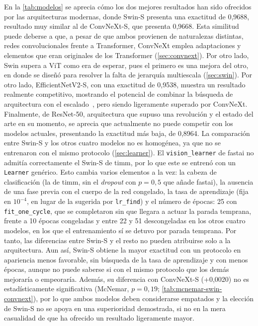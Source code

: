 En la \cref{tab:modelos} se aprecia cómo los dos mejores resultados han sido ofrecidos por las arquitecturas modernas, donde Swin-S presenta una exactitud de 0,9688, resultado muy similar al de ConvNeXt-S, que presenta 0,9668. Esta similitud puede deberse a que, a pesar de que ambos provienen de naturalezas distintas, redes convolucionales frente a Transformer, ConvNeXt emplea adaptaciones y elementos que eran originales de los Transformer (\cref{sec:convnext}). Por otro lado, Swin supera a ViT como era de esperar, pues el primero es una mejora del otro, en donde se diseñó para resolver la falta de jerarquía multiescala (\cref{sec:swin}). Por otro lado, EfficientNetV2-S, con una exactitud de 0,9538, muestra un resultado realmente competitivo, mostrando el potencial de combinar la búsqueda de arquitectura con el escalado~\cite{tan2021}, pero siendo ligeramente superado por ConvNeXt. Finalmente, de ResNet-50, arquitectura que supuso una revolución y el estado del arte en su momento, se aprecia que actualmente no puede competir con los modelos actuales, presentando la exactitud más baja, de 0,8964.
La comparación entre Swin-S y los otros cuatro modelos no es homogénea, ya que no se entrenaron con el mismo protocolo (\cref{sec:learner}). El \texttt{vision\_learner} de fastai no admitía correctamente el Swin-S de timm, por lo que este se entrenó con un \texttt{Learner} genérico. Esto cambia varios elementos a la vez: la cabeza de clasificación (la de timm, sin el \emph{dropout} con $p = 0{,}5$ que añade fastai),
 la ausencia de una fase previa con el cuerpo de la red congelado, la tasa de aprendizaje (fija en $10^{-4}$, en lugar de la sugerida por \texttt{lr\_find}) y el número de épocas: 25 con \texttt{fit\_one\_cycle}, que se completaron sin que llegara a actuar la parada temprana, frente a 10 épocas congeladas y entre 22 y 51 descongeladas en los otros cuatro modelos, en los que el entrenamiento sí se detuvo por parada temprana. 
 Por tanto, las diferencias entre Swin-S y el resto no pueden atribuirse solo a la arquitectura. Aun así, Swin-S obtiene la mayor exactitud con un protocolo en apariencia menos favorable, sin búsqueda de la tasa de aprendizaje y con menos épocas, aunque no puede saberse si con el mismo protocolo que los demás mejoraría o empeoraría. Además, su diferencia con ConvNeXt-S (+0,0020) no es estadísticamente significativa (McNemar, $p = 0{,}19$; \cref{tab:mcnemar-swin-convnext}),
  por lo que ambos modelos deben considerarse empatados y la elección de Swin-S no se apoya en una superioridad demostrada, si no en la mera casualidad de que ha ofrecido un resultado ligeramente mayor. 

